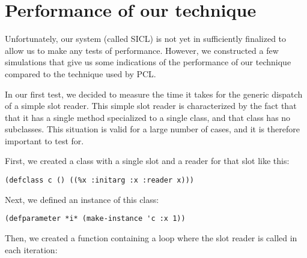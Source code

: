 \section{Performance of our technique}

Unfortunately, our system (called SICL) is not yet in sufficiently
finalized to allow us to make any tests of performance.  However, we
constructed a few simulations that give us some indications of the
performance of our technique compared to the technique used by PCL.

In our first test, we decided to measure the time it takes for the
generic dispatch of a simple slot reader.  This simple slot reader is
characterized by the fact that that it has a single method specialized
to a single class, and that class has no subclasses.  This situation
is valid for a large number of cases, and it is therefore important to
test for.

First, we created a class with a single slot and a reader for that
slot like this:

{\small\begin{verbatim}
(defclass c () ((%x :initarg :x :reader x)))  
\end{verbatim}}

Next, we defined an instance of this class:

{\small\begin{verbatim}
(defparameter *i* (make-instance 'c :x 1))
\end{verbatim}}

Then, we created a function containing a loop where the slot reader is
called in each iteration: 

